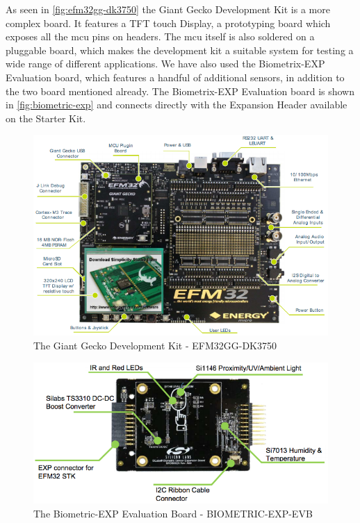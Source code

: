 As seen in \autoref{fig:efm32gg-dk3750} the Giant Gecko Development Kit is a more complex board.
It features a TFT touch Display, a prototyping board which exposes all the \gls{mcu} pins on headers.
The \gls{mcu} itself is also soldered on a pluggable board, which makes the development kit a suitable system for testing a wide range of different applications.
We have also used the Biometrix-EXP Evaluation board, which features a handful of additional sensors, in addition to the two board mentioned already.
The Biometrix-EXP Evaluation board is shown in \autoref{fig:biometric-exp} and connects directly with the Expansion Header available on the Starter Kit.

\begin{figure}[H]
  \begin{center}
    \includegraphics[scale=0.5]{figures/efm32gg-dk3750}
  \end{center}
  \caption{The Giant Gecko Development Kit - EFM32GG-DK3750 \cite{UM-DK}}
  \label{fig:efm32gg-dk3750}
\end{figure}

\begin{figure}[H]
  \begin{center}
    \includegraphics[scale=0.5]{figures/biometric-exp}
  \end{center}
  \caption{The Biometric-EXP Evaluation Board - BIOMETRIC-EXP-EVB \cite{UG-BIO-EXP}}
  \label{fig:biometric-exp}
\end{figure}


